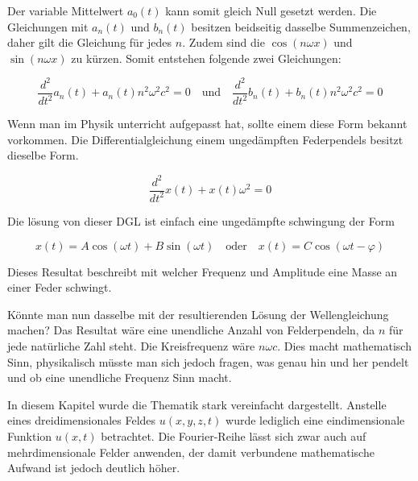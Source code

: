 Der variable Mittelwert $a_0(t)$ kann somit gleich Null gesetzt werden.
Die Gleichungen mit $a_n(t)$ und $b_n(t)$ besitzen beidseitig dasselbe Summenzeichen, daher gilt die Gleichung für jedes $n$. 
Zudem sind die $\cos(n\omega x)$ und $\sin(n\omega x)$ zu kürzen. 
Somit entstehen folgende zwei Gleichungen:

\begin{equation}
	\frac{d^2}{dt^2} a_n(t) + a_n(t) n^2 \omega^2 c^2 = 0
	  \quad   \text{und} \quad  \frac{d^2}{dt^2} b_n(t) + b_n(t) n^2 \omega^2 c^2 = 0
\end{equation}

Wenn man im Physik unterricht aufgepasst hat, sollte einem diese Form bekannt vorkommen. Die Differentialgleichung einem ungedämpften Federpendels besitzt dieselbe Form. 

\begin{equation}
	\frac{d^2}{dt^2} x(t) + x(t) \omega^2  = 0
\end{equation}

Die lösung von dieser DGL ist einfach eine ungedämpfte schwingung der Form 

\begin{equation}
x(t) = A \cos(\omega t) + B \sin(\omega t) \quad \text{oder} \quad x(t) = C \cos(\omega t - \varphi)
\end{equation}

Dieses Resultat beschreibt mit welcher Frequenz und Amplitude eine Masse an einer Feder schwingt. 

Könnte man nun dasselbe mit der resultierenden Lösung der Wellengleichung machen?
Das Resultat wäre eine unendliche Anzahl von Felderpendeln, da $n$ für jede natürliche Zahl steht. 
Die Kreisfrequenz wäre  $n \omega c$. 
Dies macht mathematisch Sinn, physikalisch müsste man sich jedoch fragen, was genau hin und her pendelt und ob eine unendliche Frequenz Sinn macht.


In diesem Kapitel wurde die Thematik stark vereinfacht dargestellt. 
Anstelle eines dreidimensionales Feldes $u(x,y,z,t)$ wurde lediglich eine eindimensionale Funktion $u(x,t)$ betrachtet. Die Fourier-Reihe lässt sich zwar auch auf mehrdimensionale Felder anwenden, der damit verbundene mathematische Aufwand ist jedoch deutlich höher. 








